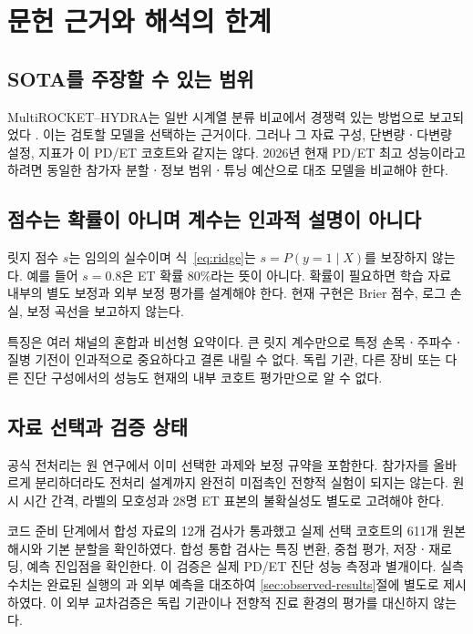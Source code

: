 \documentclass[11pt,a4paper]{article}
\newcommand{\code}[1]{\texttt{\detokenize{#1}}}
\numberwithin{equation}{section}
\begin{document}
\section{문헌 근거와 해석의 한계}
\subsection{SOTA를 주장할 수 있는 범위}
MultiROCKET--HYDRA는 일반 시계열 분류 비교에서 경쟁력 있는 방법으로
보고되었다 \cite{bakeoff}. 이는 검토할 모델을 선택하는 근거이다.
그러나 그 자료 구성, 단변량ㆍ다변량 설정, 지표가 이 PD/ET 코호트와 같지는 않다.
2026년 현재 PD/ET 최고 성능이라고 하려면
동일한 참가자 분할ㆍ정보 범위ㆍ튜닝 예산으로 대조 모델을 비교해야 한다.

\subsection{점수는 확률이 아니며 계수는 인과적 설명이 아니다}
릿지 점수 \(s\)는 임의의 실수이며
식~\eqref{eq:ridge}는 \(s=P(y=1\mid X)\)를 보장하지 않는다.
예를 들어 \(s=0.8\)은 ET 확률 80\%라는 뜻이 아니다.
확률이 필요하면 학습 자료 내부의 별도 보정과 외부 보정 평가를 설계해야 한다.
현재 구현은 Brier 점수, 로그 손실, 보정 곡선을 보고하지 않는다.

특징은 여러 채널의 혼합과 비선형 요약이다.
큰 릿지 계수만으로 특정 손목ㆍ주파수ㆍ질병 기전이 인과적으로 중요하다고
결론 내릴 수 없다. 독립 기관, 다른 장비 또는 다른 진단 구성에서의
성능도 현재의 내부 코호트 평가만으로 알 수 없다.

\subsection{자료 선택과 검증 상태}
공식 전처리는 원 연구에서 이미 선택한 과제와 보정 규약을 포함한다.
참가자를 올바르게 분리하더라도 전처리 설계까지 완전히 미접촉인
전향적 실험이 되지는 않는다. 원시 시간 간격, 라벨의 모호성과
28명 ET 표본의 불확실성도 별도로 고려해야 한다.

코드 준비 단계에서 합성 자료의 12개 검사가 통과했고
실제 선택 코호트의 611개 원본 해시와 기본 분할을 확인하였다.
합성 통합 검사는 특징 변환, 중첩 평가, 저장ㆍ재로딩, 예측 진입점을 확인한다.
이 검증은 실제 PD/ET 진단 성능 측정과 별개이다.
실측 수치는 완료된 실행의 \code{summary.json}과 외부 예측을 대조하여
\ref{sec:observed-results}절에 별도로 제시하였다.
이 외부 교차검증은 독립 기관이나 전향적 진료 환경의 평가를 대신하지 않는다.

\clearpage
\appendix
\end{document}
